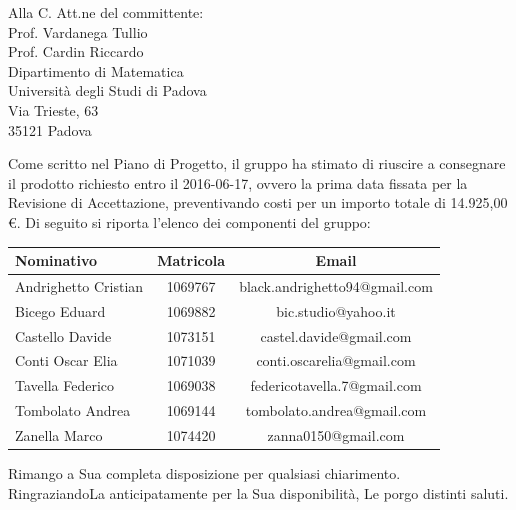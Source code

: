 \documentclass[a4paper,12pt]{letteracdp}
\begin{document}
\begin{letter}{
		Alla C. Att.ne del committente: \\
		Prof. Vardanega Tullio \\
		Prof. Cardin Riccardo \\
		Dipartimento di Matematica \\
		Università degli Studi di Padova \\
		Via Trieste, 63 \\
		35121 Padova}
\begin{itemize}
\end{itemize}

Come scritto nel Piano di Progetto, il gruppo ha stimato di riuscire a consegnare il prodotto richiesto entro il 2016-06-17, ovvero la prima data fissata per la Revisione di Accettazione, preventivando costi per un importo totale di 14.925,00 \euro.
\newpage
Di seguito si riporta l'elenco dei componenti del gruppo:

\begin{center}
		\begin{tabular}{l c c}
			\toprule
			\textbf{Nominativo} & \textbf{Matricola} & \textbf{Email} \\
			\midrule
			Andrighetto Cristian & 1069767 & black.andrighetto94@gmail.com \\
			Bicego Eduard & 1069882 & bic.studio@yahoo.it  \\
			Castello Davide	& 1073151 &	 castel.davide@gmail.com\\
			Conti Oscar Elia & 1071039 & conti.oscarelia@gmail.com \\
			Tavella Federico & 1069038 & federicotavella.7@gmail.com\\
			Tombolato Andrea & 1069144 & tombolato.andrea@gmail.com	 \\
			Zanella Marco & 1074420 & zanna0150@gmail.com \\
			\bottomrule
		\end{tabular}
\end{center}
		
		\closing{Rimango a Sua completa disposizione per qualsiasi chiarimento. \\
		RingraziandoLa anticipatamente per la Sua disponibilità, Le porgo distinti saluti.}
		
	\end{letter}
\end{document}

